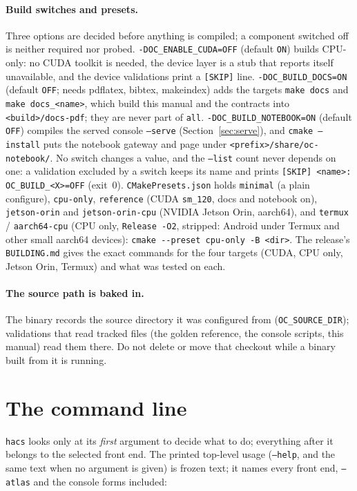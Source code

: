 \documentclass[11pt,openany]{report}
\newcommand{\app}{\texttt{hacs}}
\newcommand{\cli}[1]{\texttt{#1}}
\newcommand{\file}[1]{\nolinkurl{#1}}
\begin{document}
\paragraph{Build switches and presets.} Three options are decided before anything is compiled; a component
switched off is neither required nor probed. \cli{-DOC\_ENABLE\_CUDA=OFF} (default \texttt{ON}) builds CPU-only:
no CUDA toolkit is needed, the device layer is a stub that reports itself unavailable, and the device
validations print a \texttt{[SKIP]} line. \cli{-DOC\_BUILD\_DOCS=ON} (default \texttt{OFF}; needs pdflatex,
bibtex, makeindex) adds the targets \texttt{make docs} and \texttt{make docs\_<name>}, which build this manual
and the contracts into \texttt{<build>/docs-pdf}; they are never part of \texttt{all}.
\cli{-DOC\_BUILD\_NOTEBOOK=ON} (default \texttt{OFF}) compiles the served console \cli{--serve}
(Section~\ref{sec:serve}), and \texttt{cmake --install} puts the notebook gateway and page under
\file{<prefix>/share/oc-notebook/}. No switch changes a value, and the \cli{--list} count never depends on
one: a validation excluded by a switch keeps its name and prints \texttt{[SKIP] <name>: OC\_BUILD\_<X>=OFF}
(exit~0). \file{CMakePresets.json} holds \texttt{minimal} (a plain configure), \texttt{cpu-only},
\texttt{reference} (CUDA \texttt{sm\_120}, docs and notebook on), \texttt{jetson-orin} and
\texttt{jetson-orin-cpu} (NVIDIA Jetson Orin, aarch64), and \texttt{termux} / \texttt{aarch64-cpu} (CPU only,
\texttt{Release -O2}, stripped: Android under Termux and other small aarch64 devices):
\verb|cmake --preset cpu-only -B <dir>|. The release's \file{BUILDING.md} gives the exact commands for the four
targets (CUDA, CPU only, Jetson Orin, Termux) and what was tested on each.

\paragraph{The source path is baked in.} The binary records the source directory it was configured
from (\texttt{OC\_SOURCE\_DIR}); validations that read tracked files (the golden reference, the console
scripts, this manual) read them there. Do not delete or move that checkout while a binary built from
it is running.

\section{The command line}\label{sec:cli}

\app{} looks only at its \emph{first} argument to decide what to do; everything after it belongs to
the selected front end. The printed top-level usage (\cli{--help}, and the same text when no argument is
given) is frozen text; it names every front end, \cli{--atlas} and the console forms included:
\end{document}
